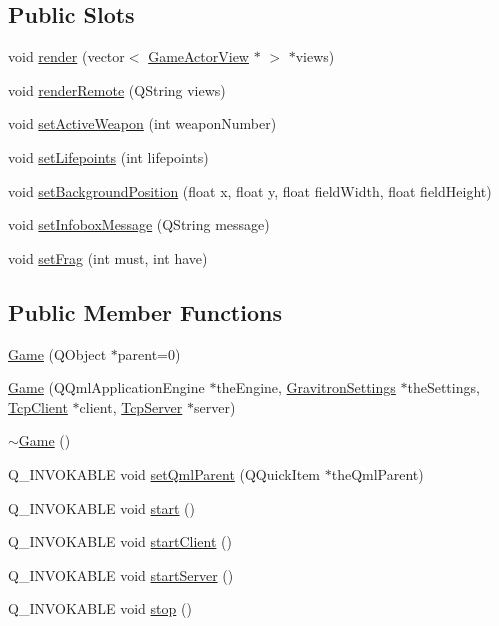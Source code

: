 \subsection*{Public Slots}
\begin{DoxyCompactItemize}
\item 
void \hyperlink{class_game_a645389b61e4d2fb43691208651c5a4e2}{render} (vector$<$ \hyperlink{class_game_actor_view}{Game\+Actor\+View} $\ast$ $>$ $\ast$views)
\item 
void \hyperlink{class_game_aab513bbe5db45b1f9dba205d0ddec74e}{render\+Remote} (Q\+String views)
\item 
void \hyperlink{class_game_a226a897819cb653c61868cbf96b90ad5}{set\+Active\+Weapon} (int weapon\+Number)
\item 
void \hyperlink{class_game_a60ef32ef5040d639aaae74c74466e186}{set\+Lifepoints} (int lifepoints)
\item 
void \hyperlink{class_game_a9955838a261e9c1aee21bc6746f11f4f}{set\+Background\+Position} (float x, float y, float field\+Width, float field\+Height)
\item 
void \hyperlink{class_game_a59f88c64cc14f60ec2d7d3f94d1e00e7}{set\+Infobox\+Message} (Q\+String message)
\item 
void \hyperlink{class_game_a8cbceafcfbb9fe7d67827c428f8f0ee6}{set\+Frag} (int must, int have)
\end{DoxyCompactItemize}
\subsection*{Public Member Functions}
\begin{DoxyCompactItemize}
\item 
\hyperlink{class_game_a1875963fc898101a29d47084aebffa28}{Game} (Q\+Object $\ast$parent=0)
\item 
\hyperlink{class_game_afeda9924813b108f34ca94e1d5ead7c9}{Game} (Q\+Qml\+Application\+Engine $\ast$the\+Engine, \hyperlink{class_gravitron_settings}{Gravitron\+Settings} $\ast$the\+Settings, \hyperlink{class_tcp_client}{Tcp\+Client} $\ast$client, \hyperlink{class_tcp_server}{Tcp\+Server} $\ast$server)
\item 
\hyperlink{class_game_ae3d112ca6e0e55150d2fdbc704474530}{$\sim$\+Game} ()
\item 
Q\+\_\+\+I\+N\+V\+O\+K\+A\+B\+L\+E void \hyperlink{class_game_ac7edf2d1ecf3e7e450a5c2b5489945f0}{set\+Qml\+Parent} (Q\+Quick\+Item $\ast$the\+Qml\+Parent)
\item 
Q\+\_\+\+I\+N\+V\+O\+K\+A\+B\+L\+E void \hyperlink{class_game_a3d9b98f7c4a96ecf578f75b96c9f0e90}{start} ()
\item 
Q\+\_\+\+I\+N\+V\+O\+K\+A\+B\+L\+E void \hyperlink{class_game_a25c97b9eb158946f4b10993dfc3cf6f3}{start\+Client} ()
\item 
Q\+\_\+\+I\+N\+V\+O\+K\+A\+B\+L\+E void \hyperlink{class_game_aed51d3d3760d9c052cdf33144ead0fba}{start\+Server} ()
\item 
Q\+\_\+\+I\+N\+V\+O\+K\+A\+B\+L\+E void \hyperlink{class_game_a17fbb36fd4a2085f9ff4f1fa93d7d08b}{stop} ()
\end{DoxyCompactItemize}


